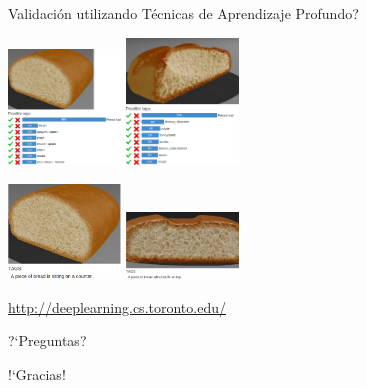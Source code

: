 \documentclass[spanish,unknownkeysallowed,10pt]{beamer}
\begin{document}
\begin{frame}{Validación utilizando Técnicas de Aprendizaje Profundo?}


\centering
\includegraphics[width=3cm]{../figures/deep1}
\includegraphics[width=3cm]{../figures/deep4}

\includegraphics[width=3cm]{../figures/deep2}
\includegraphics[width=3cm]{../figures/deep3}


\vspace{0.4cm}
\url{http://deeplearning.cs.toronto.edu/}

\end{frame}


\begin{frame}
\centering

?`Preguntas?

\end{frame}

\begin{frame}
\centering

!`Gracias!

\end{frame}
\end{document}
